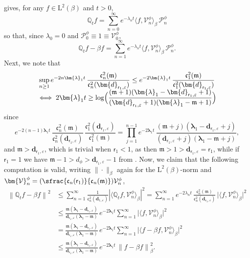 \documentclass[10pt]{amsart}
\let\epsilon\varepsilon
\newcommand{\Psfrac}[2]{(\sfrac{#1}{#2})}
\theoremstyle{plain}
\theoremstyle{definition}
\newcommand{\norm}[1]{\left\lVert#1\right\rVert}
\renewcommand{\P}{\mathcal{P}}
\newcommand{\V}{\mathcal{V}}
\newcommand{\J}{\mathds{Q}}
\newcommand{\Leb}{\mathrm{L}}
\newcommand{\m}{\mathfrak{m}}
\newcommand{\dpt}{\bm{d}_{\vat,\epsilon}}
\newcommand{\dz}{{\bm{d}}_{1,\epsilon}}
\newcommand{\lam}{{\bm{\lambda}_1}}
\newcommand{\vat}{{\mathsf{r}_1}}
\let\bpsi\beta
\begin{document}
 gives, for any $f \in \Leb^2(\bpsi)$ and $t > 0$,
\begin{equation*}
\J_t f = \sum_{n=0}^{\infty} e^{-\lambda_n t} \langle f, \V_n^\phi \rangle_{\bpsi}\, \P_n^\phi
\end{equation*}
so that, since $\lambda_0=0$ and $\P_0^\phi \equiv 1 \equiv \V_0^\phi$,
\begin{equation}
\label{eq:J-t-minus}
\J_tf - \bpsi f = \sum_{n=1}^\infty e^{-\lambda_n t} \langle f, \V_n^\phi \rangle_{\bpsi}\, \P_n^\phi.
\end{equation}
Next, we note that
\begin{multline}
\label{eq:sup-t}
\sup_{n \geq 1} e^{-2n\lam t}\,\frac{\mathfrak{c}_n^2(\m)}{\mathfrak{c}_n^2(\dpt)} \leq e^{- 2\lam t}\,\frac{\mathfrak{c}_1^2(\m)}{\mathfrak{c}_1^2(\dpt)}\\[-5pt]
\iff 2\lam t \geq \log\Bigl(\frac{(\m+1)(\lam-\dpt+1)}{(\dpt+1)(\lam-\m+1)}\Bigr)
\end{multline}
since
\begin{equation*}
e^{-2(n-1)\lam t}\,\frac{\mathfrak{c}_n^2(\m)}{\mathfrak{c}_n^2(\dpt)}\,\frac{\mathfrak{c}_1^2(\dpt)}{\mathfrak{c}_1^2(\m)} = \prod_{j=1}^{n-1} e^{-2\lam t}\, \frac{(\m+j)(\lam-\dpt+j)}{(\dpt+j)(\lam-\m+j)},
\end{equation*}
and $\m > \dpt$, which is trivial when $\vat < 1$, as then $\m > 1 > \dpt = \vat$, while if $\vat =1$ we have $\m-1> d_\phi > \dpt-1$ from \cite[Prop.\,4.4(1)]{Patie-Savov-GeL}. Now, we claim that the following computation is valid, writing $\|{\cdot}\|_\bpsi$ again for the $\Leb^2(\bpsi)$-norm and $\bm{\V}_n^\phi = \Psfrac{\mathfrak{c}_n(\vat)}{\mathfrak{c}_n(\m)}\V_n^\phi$,
\begin{align*}
\norm{\J_t f - \bpsi f}^2
&\leq \sum_{n=1}^\infty \frac{1}{\mathfrak{c}_n^2(\dz)} \left| \langle \J_t f, \V_n^\phi \rangle_{\bpsi} \right|^2 = \sum_{n=1}^\infty e^{-2 \lambda_n t}\,\frac{\mathfrak{c}_n^2(\m)}{\mathfrak{c}_n^2(\dpt)}\, \bigl| \bigl\langle f, \bm{\V}_n^\phi \bigr\rangle_{\bpsi} \bigr|^2 \\
&\leq \frac{\m(\lam-\dpt)}{\dpt(\lam-\m)}\, e^{-2\lam t} \sum_{n=1}^\infty \bigl| \bigl\langle f, \bm{\V}_n^\phi \bigr\rangle_{\bpsi} \bigr|^2\\
&= \frac{\m(\lam-\dpt)}{\dpt(\lam-\m)}\, e^{-2\lam t} \sum_{n=1}^\infty \bigl| \bigl\langle f-\bpsi f, \bm{\V}_n^\phi \bigr\rangle_{\bpsi} \bigr|^2 \\
&\leq \frac{\m(\lam-\dpt)}{\dpt(\lam-\m)}\, e^{-2\lam t}\, \norm{f-\bpsi f}_\bpsi^2.
\end{align*}
\end{document}
